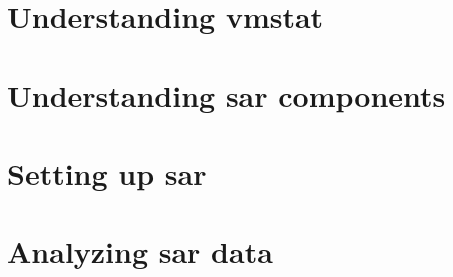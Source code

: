 
\usepackage{minted}
\usepackage{booktabs}


	
	
	\section{Understanding vmstat}
	
	
	\section{Understanding sar components}
	\section{Setting up sar}
	\section{Analyzing sar data}
	



